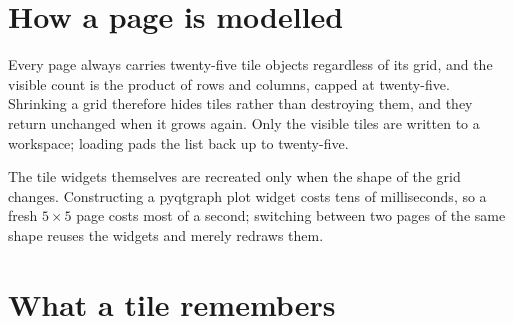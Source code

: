 \documentclass[11pt,a4paper,oneside]{report}
\begin{document}
\section{How a page is modelled}

Every page always carries twenty-five tile objects regardless of its grid, and
the visible count is the product of rows and columns, capped at twenty-five.
Shrinking a grid therefore hides tiles rather than destroying them, and they
return unchanged when it grows again. Only the visible tiles are written to a
workspace; loading pads the list back up to twenty-five.

The tile widgets themselves are recreated only when the shape of the grid
changes. Constructing a pyqtgraph plot widget costs tens of milliseconds, so a
fresh $5 \times 5$ page costs most of a second; switching between two pages of
the same shape reuses the widgets and merely redraws them.

\section{What a tile remembers}
\end{document}
